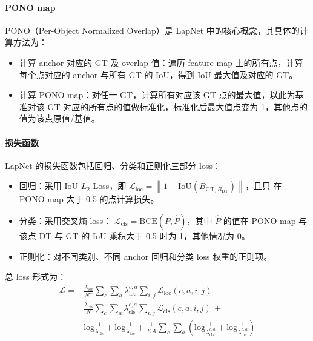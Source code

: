 \paragraph{PONO map}
PONO（Per-Object Normalized Overlap）是 LapNet 中的核心概念，其具体的计算方法为：

\begin{itemize}
  \item 计算 anchor 对应的 GT 及 overlap 值：遍历 feature map 上的所有点，计算
    每个点对应的 anchor 与所有 GT 的 IoU，得到 IoU 最大值及对应的 GT。
  \item 计算 PONO map：对任一 GT，计算所有对应该 GT 点的最大值，以此为基准对该 GT
    对应的所有点的值做标准化，标准化后最大值点变为 1，其他点的值为该点原值/基值。
\end{itemize}

\paragraph{损失函数}
LapNet 的损失函数包括回归、分类和正则化三部分 loss：

\begin{itemize}
  \item 回归：采用 IoU $L_2$ Loss，即 $\mathcal{L}_{\mathrm{loc}} =
    \left \| 1 - \mathrm{IoU}(B_{\mathrm{GT}, B_{\mathrm{DT}}}) \right\|$，且只
    在 PONO map 大于 0.5 的点计算损失。
  \item 分类：采用交叉熵 loss：
    $\mathcal{L}_{\mathrm{cls}}=\mathrm{BCE}(P, \hat{P})$，其中 $\hat{P}$ 的值在
    PONO map 与该点 DT 与 GT 的 IoU 乘积大于 0.5 时为 1，其他情况为 0。
  \item 正则化：对不同类别、不同 anchor 回归和分类 loss 权重的正则项。
\end{itemize}

总 loss 形式为：
\begin{align}
  \mathcal{L} = & \frac{\lambda_{\mathrm{loc}}}{N^+}\sum_c \sum_a \lambda_{\mathrm{loc}}^{c,a} \sum_{i, j}\mathcal{L}_{\mathrm{loc}}(c,a,i,j) \, + \\
                & \frac{\lambda_{\mathrm{cls}}}{N}\sum_c \sum_a \lambda_{\mathrm{cls}}^{c,a} \sum_{i, j}\mathcal{L}_{\mathrm{cls}}(c,a,i,j) \, + \\
                & \mathrm{log}\frac{1}{\lambda_{\mathrm{cls}}} + \mathrm{log}\frac{1}{\lambda_{\mathrm{loc}}} + \frac{1}{KA}\sum_{c}\sum_{a}\left( \mathrm{log}\frac{1}{\lambda_{\mathrm{cls}}^{c,a}} + \mathrm{log}\frac{1}{\lambda_{\mathrm{loc}}^{c,a}} \right)
\end{align}

